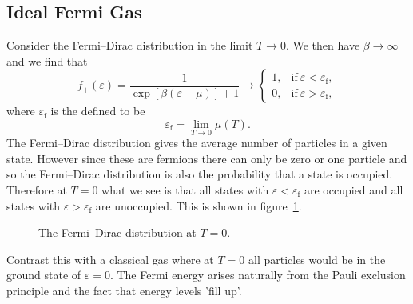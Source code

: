 \documentclass[a4paper]{article}
\newcommand{\fermiEnergy}{\varepsilon_{\mathrm{f}}}
\begin{document}
    \subsection{Ideal Fermi Gas}
    Consider the Fermi--Dirac distribution in the limit \(T\to 0\).
    We then have \(\beta\to\infty\) and we find that
    \[
        f_{+}(\varepsilon) = \frac{1}{\exp[\beta(\varepsilon - \mu)] + 1} \to
        \begin{cases}
            1, & \text{if}~\varepsilon < \fermiEnergy,\\
            0, & \text{if}~\varepsilon > \fermiEnergy,
        \end{cases}
    \]
    where \(\fermiEnergy\) is the  defined to be
    \[\fermiEnergy = \lim_{T\to 0} \mu(T).\]
    The Fermi--Dirac distribution gives the average number of particles in a given state.
    However since these are fermions there can only be zero or one particle and so the Fermi--Dirac distribution is also the probability that a state is occupied.
    Therefore at \(T = 0\) what we see is that all states with \(\varepsilon < \fermiEnergy\) are occupied and all states with \(\varepsilon > \fermiEnergy\) are unoccupied.
    This is shown in figure~\ref{fig:Fermi function at T = 0}.
    \begin{figure}[ht]
        \centering
        \caption{The Fermi--Dirac distribution at \(T = 0\).}
        \label{fig:Fermi function at T = 0}
    \end{figure}
    Contrast this with a classical gas where at \(T = 0\) all particles would be in the ground state of \(\varepsilon = 0\).
    The Fermi energy arises naturally from the Pauli exclusion principle and the fact that energy levels 'fill up'.
    
\end{document}
